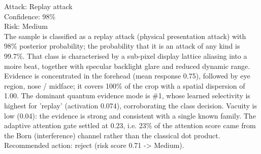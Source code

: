 \raggedright
Attack: Replay attack \\
Confidence: 98\% \\
Risk: Medium \\[4pt]
The sample is classified as a replay attack (physical presentation attack) with 98\% posterior probability; the probability that it is an attack of any kind is 99.7\%. That class is characterised by a sub-pixel display lattice aliasing into a moire beat, together with specular backlight glare and reduced dynamic range. Evidence is concentrated in the forehead (mean response 0.75), followed by eye region, nose / midface; it covers 100\% of the crop with a spatial dispersion of 1.00. The dominant quantum evidence mode is \#1, whose learned selectivity is highest for 'replay' (activation 0.074), corroborating the class decision. Vacuity is low (0.04): the evidence is strong and consistent with a single known family. The adaptive attention gate settled at 0.23, i.e. 23\% of the attention score came from the Born (interference) channel rather than the classical dot product. Recommended action: reject (risk score 0.71 -> Medium).
